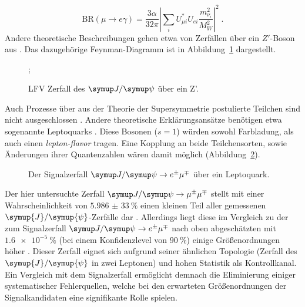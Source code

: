 %
\begin{equation}
  \label{eq:BRmuega}
  \text{BR}(\mu\rightarrow e\gamma)=\frac{3\alpha}{32\pi}\left|\sum_i U_{\mu i}^*U_{ei}\frac{m^2_{\nu_i}}{M^2_W}\right|^2\; .
\end{equation}
%
Andere theoretische Beschreibungen gehen etwa von Zerfällen über ein $Z'$-Boson aus \cite{zprime}. Das dazugehörige Feynman-Diagramm ist in Abbildung~\ref{fig:Zprime} dargestellt.
%
\begin{figure}
  \centering
  ;
\caption{LFV Zerfall des $\jpsi$ über ein Z'.}
\label{fig:Zprime}
\end{figure}
%
Auch Prozesse über aus der Theorie der Supersymmetrie postulierte Teilchen sind nicht ausgeschlossen \cite{susy_gut1, susy_gut2}. Andere theoretische Erklärungsansätze benötigen etwa sogenannte Leptoquarks \cite{leptoq}. Diese Bosonen ($s=1$) würden sowohl Farbladung, als auch einen \textit{lepton-flavor} tragen. Eine Kopplung an beide Teilchensorten, sowie Änderungen ihrer Quantenzahlen wären damit möglich (Abbildung~\ref{fig:lepto}).
%
\begin{figure}[H]
  \centering
    \caption{Der Signalzerfall $\signal$ über ein Leptoquark.}
    \label{fig:lepto}
  \end{figure}
%
Der hier untersuchte Zerfall $\kontroll$ stellt mit einer Wahrscheinlichkeit von $\SI{5,986(33)}{\percent}$ einen kleinen Teil aller gemessenen $\symup{J}/\symup{\psi}$-Zerfälle dar \cite{pdg}. Allerdings liegt diese im Vergleich zu der zum Signalzerfall $\signal$ nach oben abgeschätzten mit $\SI{1,6e-5}{\percent}$ (bei einem Konfidenzlevel von $\SI{90}{\percent}$) einige Größenordnungen höher \cite{pdg}. Dieser Zerfall eignet sich aufgrund seiner ähnlichen Topologie (Zerfall des $\symup{J}/\symup{\psi}$ in zwei Leptonen) und hohen Statistik als Kontrollkanal. Ein Vergleich mit dem Signalzerfall ermöglicht demnach die Eliminierung einiger systematischer Fehlerquellen, welche bei den erwarteten Größenordnungen der Signalkandidaten eine signifikante Rolle spielen.
